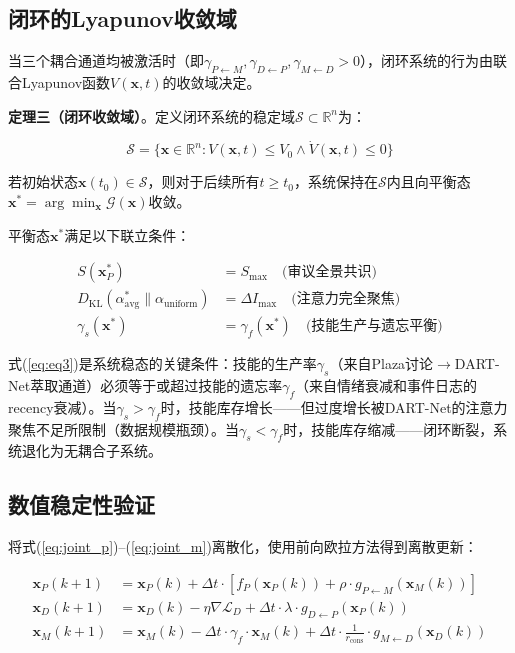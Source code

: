 \documentclass[twocolumn,10.5pt]{ctexart}
\def\R{\mathbb{R}}
\def\cG{\mathcal{G}}
\def\cL{\mathcal{L}}
\begin{document}
\subsection{闭环的Lyapunov收敛域}

当三个耦合通道均被激活时（即$\gamma_{P\leftarrow M}, \gamma_{D\leftarrow P}, \gamma_{M\leftarrow D} > 0$），闭环系统的行为由联合Lyapunov函数$V(\mathbf{x}, t)$的收敛域决定。

\textbf{定理三（闭环收敛域）}。定义闭环系统的稳定域$\mathcal{S} \subset \R^n$为：

\begin{equation}
\mathcal{S} = \{\mathbf{x} \in \R^n : V(\mathbf{x}, t) \leq V_0 \land \dot{V}(\mathbf{x}, t) \leq 0\}
\label{eq:stability_domain}
\end{equation}

若初始状态$\mathbf{x}(t_0) \in \mathcal{S}$，则对于后续所有$t \geq t_0$，系统保持在$\mathcal{S}$内且向平衡态$\mathbf{x}^* = \arg\min_\mathbf{x} \cG(\mathbf{x})$收敛。

平衡态$\mathbf{x}^*$满足以下联立条件：

\begin{align}
S(\mathbf{x}_P^*) &= S_{\max} \quad \text{(审议全景共识)} \label{eq:eq1} \\
D_{\text{KL}}(\alpha_{\text{avg}}^* \parallel \alpha_{\text{uniform}}) &= \Delta I_{\max} \quad \text{(注意力完全聚焦)} \label{eq:eq2} \\
\gamma_s(\mathbf{x}^*) &= \gamma_f(\mathbf{x}^*) \quad \text{(技能生产与遗忘平衡)} \label{eq:eq3}
\end{align}

式(\ref{eq:eq3})是系统稳态的关键条件：技能的生产率$\gamma_s$（来自Plaza讨论$\to$DART-Net萃取通道）必须等于或超过技能的遗忘率$\gamma_f$（来自情绪衰减和事件日志的recency衰减）。当$\gamma_s > \gamma_f$时，技能库存增长——但过度增长被DART-Net的注意力聚焦不足所限制（数据规模瓶颈）。当$\gamma_s < \gamma_f$时，技能库存缩减——闭环断裂，系统退化为无耦合子系统。

\subsection{数值稳定性验证}

将式(\ref{eq:joint_p})--(\ref{eq:joint_m})离散化，使用前向欧拉方法得到离散更新：

\begin{align}
\mathbf{x}_P(k+1) &= \mathbf{x}_P(k) + \Delta t \cdot [f_P(\mathbf{x}_P(k)) + \rho \cdot g_{P\leftarrow M}(\mathbf{x}_M(k))] \label{eq:disc_p} \\
\mathbf{x}_D(k+1) &= \mathbf{x}_D(k) - \eta \nabla \cL_D + \Delta t \cdot \lambda \cdot g_{D\leftarrow P}(\mathbf{x}_P(k)) \label{eq:disc_d} \\
\mathbf{x}_M(k+1) &= \mathbf{x}_M(k) - \Delta t \cdot \gamma_f \cdot \mathbf{x}_M(k) + \Delta t \cdot \frac{1}{r_{\text{cons}}} \cdot g_{M\leftarrow D}(\mathbf{x}_D(k)) \label{eq:disc_m}
\end{align}
\end{document}
